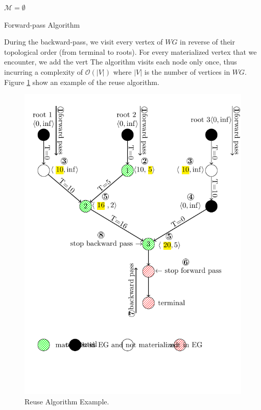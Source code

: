 \begin{algorithm}[h]
$\mathcal{M} = \emptyset$\;
\caption{Forward-pass Algorithm}\label{forward-pass}
\end{algorithm}
During the backward-pass, we visit every vertex of $WG$ in reverse of their topological order (from terminal to roots).
For every materialized vertex that we encounter, we add the vert
The algorithm visits each node only once, thus incurring a complexity of $\mathcal{O}(|V|)$ where $|V|$ is the number of vertices in $WG$.
Figure \ref{fig-reuse-algorithm} show an example of the reuse algorithm.


\begin{figure}
\centering
\includegraphics[width=\linewidth]{../images/tikz-standalone/reuse-algorithm}
\caption{Reuse Algorithm Example.}
\label{fig-reuse-algorithm}
\end{figure}


